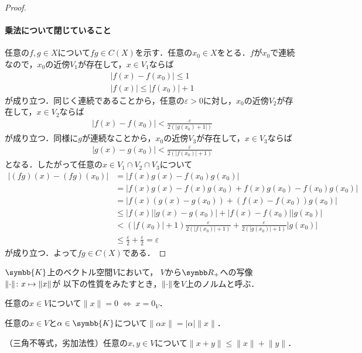 \documentclass[../main.tex]{subfiles}
\begin{document}
\begin{proof}
\paragraph{乗法について閉じていること} 任意の\(f, g \in X\)について\(fg \in C(X)\)を示す．任意の\(x_0 \in X\)をとる．\(f\)が\(x_0\)で連続なので，\(x_0\)の近傍\(V_1\)が存在して，\(x \in V_1\)ならば
\begin{gather*}
  |f(x) - f(x_0)| \leq 1 \\
  |f(x) | \leq | f(x_0)| + 1
\end{gather*}
が成り立つ．同じく連続であることから，任意の\(\varepsilon > 0\)に対し，\(x_0\)の近傍\(V_2\)が存在して，\(x \in V_2\)ならば
\begin{align*}
  |f(x) - f(x_0)| < \frac{\varepsilon}{2(|g(x_0) + 1|)}
\end{align*}
が成り立つ．同様に\(g\)が連続なことから，\(x_0\)の近傍\(V_3\)が存在して，\(x \in V_3\)ならば
\begin{align*}
  |g(x) - g(x_0)| < \frac{\varepsilon}{2(|f(x_0)| + 1)}
\end{align*}
となる．したがって任意の\(x \in V_1 \cap V_2 \cap V_3\)について
\begin{align*}
  |(fg)(x) - (fg)(x_0)|
  &= |f(x)g(x) - f(x_0)g(x_0)| \\
  &= |f(x)g(x) - f(x)g(x_0) + f(x)g(x_0) - f(x_0)g(x_0)| \\
  &= |f(x)(g(x) - g(x_0)) + (f(x) - f(x_0))g(x_0)| \\
  &\leq |f(x)| |g(x) - g(x_0)| + |f(x) - f(x_0)| | g(x_0)| \\
  &< (|f(x_0)| + 1) \frac{\varepsilon}{2(|f(x_0)| + 1)} + \frac{\varepsilon}{2(|g(x_0)| + 1)} |g(x_0)| \\
  &\leq \frac{\varepsilon}{2} + \frac{\varepsilon}{2} = \varepsilon
\end{align*}
が成り立つ．よって\(fg \in C(X)\)である．
\end{proof}

\begin{thmbox}
\begin{definition}[（ノルム）]
\(\symbb{K}\)上のベクトル空間\(V\)において，
\(V\)から\(\NonNegReal\)への写像\(\lVert\mathord{\cdot}\rVert\colon x \mapsto \lVert x \rVert\)が
以下の性質をみたすとき，\(\lVert \mathord{\cdot} \rVert\)を\(V\)上のノルムと呼ぶ．
\begin{conditions}
    \item 任意の\(x \in V\)について\(\|x\| = 0\;\Leftrightarrow\;x = 0_V\)．
    \item 任意の\(x \in V\)と\(\alpha \in \symbb{K}\)について\(\lVert \alpha x\rVert = |\alpha|\lVert x \rVert\)．
    \item （三角不等式，劣加法性）任意の\(x, y \in V\)について\(\lVert x + y \rVert \leq \lVert x\rVert + \lVert y \rVert\)．
\end{conditions}
\end{definition}
\end{thmbox}
\end{document}
